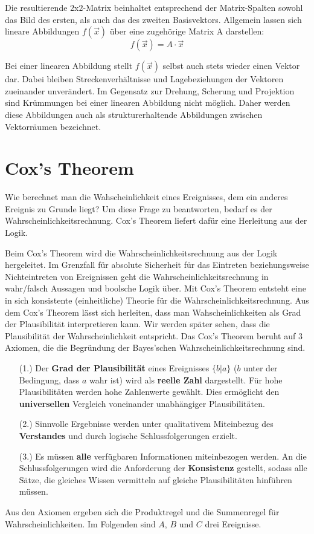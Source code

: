 \documentclass[]{dsadokumentation}
\begin{document}
Die resultierende $2$x$2$-Matrix beinhaltet entsprechend der Matrix-Spalten sowohl das Bild des ersten, als auch das des zweiten Basisvektors. Allgemein lassen sich lineare Abbildungen $f(\vec{x})$ über eine zugehörige Matrix A darstellen:
\[ f(\vec{x}) = A \cdot \vec{x} \]

Bei einer linearen Abbildung stellt $f(\vec{x})$ selbst auch stets wieder einen Vektor dar. Dabei bleiben Streckenverhältnisse und Lagebeziehungen der Vektoren zueinander unverändert. Im Gegensatz zur Drehung, Scherung und Projektion sind Krümmungen bei einer linearen Abbildung nicht möglich. Daher werden diese Abbildungen auch als strukturerhaltende Abbildungen zwischen Vektorräumen bezeichnet.

\section{Cox's Theorem}
Wie berechnet man die Wahscheinlichkeit eines Ereignisses, dem ein anderes Ereignis zu Grunde liegt? Um diese Frage zu beantworten, bedarf es der Wahrscheinlichkeitsrechnung. Cox's Theorem liefert dafür eine Herleitung aus der Logik.


Beim Cox's Theorem wird die Wahrscheinlichkeitsrechnung aus  der Logik hergeleitet. Im Grenzfall für absolute Sicherheit für das Eintreten beziehungsweise Nichteintreten von Ereignissen geht die Wahrscheinlichkeitsrechnung in wahr/falsch Aussagen und boolsche Logik über. Mit Cox's Theorem entsteht eine in sich konsistente (einheitliche) Theorie für die Wahrscheinlichkeitsrechnung.
Aus dem Cox's Theorem lässt sich herleiten, dass man Wahscheinlichkeiten als Grad der Plausibilität interpretieren kann. Wir werden später sehen, dass die Plausibilität der Wahrscheinlichkeit entspricht.
Das Cox's Theorem beruht auf 3 Axiomen, die die Begründung der Bayes'schen Wahrscheinlichkeitsrechnung sind.

{
\begin{itemize}
 \item[(1.)] Der \textbf{Grad der Plausibilität} eines Ereignisses $\{b|a\}$ ($b$ unter der Bedingung, dass $a$ wahr ist) wird als \textbf {reelle Zahl} dargestellt. Für hohe Plausibilitäten werden hohe Zahlenwerte gewählt. Dies ermöglicht den \textbf {universellen} Vergleich voneinander unabhängiger Plausibilitäten.

 \item[(2.)] Sinnvolle Ergebnisse werden unter qualitativem Miteinbezug des \textbf {Verstandes} und durch logische Schlussfolgerungen erzielt.
 \item[(3.)] Es müssen \textbf {alle }verfügbaren Informationen miteinbezogen werden. An die Schlussfolgerungen wird die Anforderung der \textbf {Konsistenz }gestellt, sodass alle Sätze, die gleiches Wissen vermitteln auf gleiche Plausibilitäten hinführen müssen.
\end{itemize}
}
Aus den Axiomen ergeben sich die Produktregel und die Summenregel für Wahrscheinlichkeiten. Im Folgenden sind $A$, $B$ und $C$ drei Ereignisse.
\end{document}
